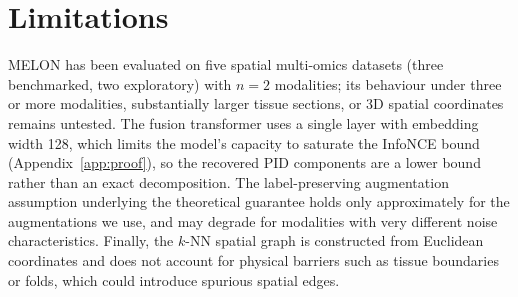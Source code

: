 \documentclass{article}
\theoremstyle{plain}
\theoremstyle{definition}
\begin{document}
\FloatBarrier

\section{Limitations}\label{app:limitations}

MELON has been evaluated on five spatial multi-omics datasets (three benchmarked, two exploratory) with $n=2$ modalities; its behaviour under three or more modalities, substantially larger tissue sections, or 3D spatial coordinates remains untested. The fusion transformer uses a single layer with embedding width 128, which limits the model's capacity to saturate the InfoNCE bound (Appendix~\ref{app:proof}), so the recovered PID components are a lower bound rather than an exact decomposition. The label-preserving augmentation assumption underlying the theoretical guarantee holds only approximately for the augmentations we use, and may degrade for modalities with very different noise characteristics. Finally, the $k$-NN spatial graph is constructed from Euclidean coordinates and does not account for physical barriers such as tissue boundaries or folds, which could introduce spurious spatial edges.
\end{document}
